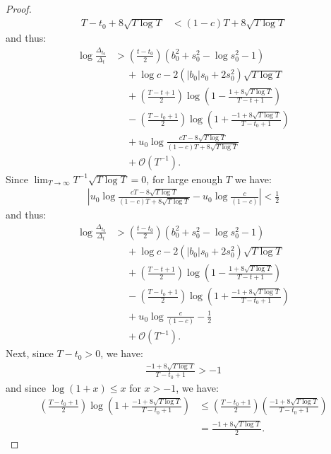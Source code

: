 \documentclass{article}
\begin{document}
\begin{proof}
\begin{align*}
    T-t_0 + 8 \sqrt{T\log T} &< (1-c)T + 8 \sqrt{T\log T} 
\end{align*}
and thus:
\begin{align*}
    \log \frac{\Delta_{t_0}}{\Delta_t} &> \left(\frac{t-t_0}{2}\right)(b_0^2 + s_0^2 - \log s_0^2 - 1) \\
    &\quad\: + \log c - 2 (|b_0|s_0 +2s_0^2) \sqrt{T \log T} \\
    &\quad\: + \left(\frac{T - t+1}{2}\right)\log\left(1 - \frac{1 + 8\sqrt{T \log T}}{T-t+1}\right)\\
    &\quad\: - \left(\frac{T - t_0+1}{2}\right)\log\left(1 + \frac{-1 + 8\sqrt{T \log T}}{T-t_0+1}\right)  \\
    &\quad\: + u_0\log \frac{cT - 8\sqrt{T \log T}}{(1-c)T + 8\sqrt{T \log T}} \\
    &\quad\: + \mathcal{O}(T^{-1}).
\end{align*}
Since $\lim_{T\to\infty} T^{-1} \sqrt{T\log T} = 0$, for large enough $T$ we have: 
\begin{align*}
    \left|u_0\log \frac{cT - 8\sqrt{T \log T}}{(1-c)T + 8\sqrt{T \log T}} - u_0\log \frac{c}{(1-c)}\right| < \frac{1}{2}
\end{align*}
and thus:
\begin{align*}
    \log \frac{\Delta_{t_0}}{\Delta_t} &> \left(\frac{t-t_0}{2}\right)(b_0^2 + s_0^2 - \log s_0^2 - 1) \\
    &\quad\: + \log c - 2 (|b_0|s_0 +2s_0^2) \sqrt{T \log T} \\
    &\quad\: + \left(\frac{T - t+1}{2}\right)\log\left(1 - \frac{1 + 8\sqrt{T \log T}}{T-t+1}\right)\\
    &\quad\: - \left(\frac{T - t_0+1}{2}\right)\log\left(1 + \frac{-1 + 8\sqrt{T \log T}}{T-t_0+1}\right)  \\
    &\quad\: + u_0\log \frac{c}{(1-c)} - \frac{1}{2} \\
    &\quad\: + \mathcal{O}(T^{-1}).
\end{align*}
Next, since $T-t_0 > 0$, we have:
\begin{align*}
    \frac{-1 + 8\sqrt{T \log T}}{T-t_0+1} > -1
\end{align*}
and since $\log(1+x) \leq x$ for $x > -1$, we have:
\begin{align*}
    \left(\frac{T - t_0 + 1}{2}\right)\log\left(1 + \frac{-1 + 8\sqrt{T \log T}}{T-t_0+1}\right)  &\leq \left(\frac{T - t_0+1}{2}\right) \left(\frac{-1 + 8\sqrt{T \log T}}{T-t_0+1}\right) \\
    &= \frac{-1 + 8\sqrt{T \log T}}{2}.

\end{align*}
\end{proof}
\end{document}
